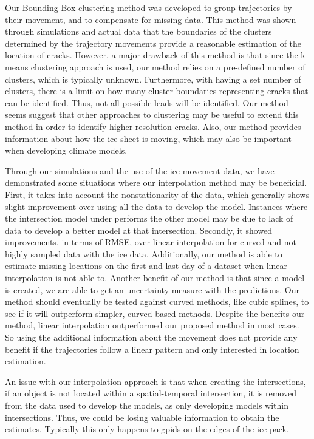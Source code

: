 \documentclass[12pt]{article}
\begin{document}
Our Bounding Box clustering method was developed to group trajectories
by their movement, and to compensate for missing data. This method was
shown through simulations and actual data that the boundaries of the
clusters determined by the trajectory movements provide a reasonable
estimation of the location of cracks. However, a major drawback of this
method is that since the k-means clustering approach is used, our method
relies on a pre-defined number of clusters, which is typically unknown.
Furthermore, with having a set number of clusters, there is a limit on
how many cluster boundaries representing cracks that can be identified.
Thus, not all possible leads will be identified. Our method seems
suggest that other approaches to clustering may be useful to extend this
method in order to identify higher resolution cracks. Also, our method
provides information about how the ice sheet is moving, which may also
be important when developing climate models.

Through our simulations and the use of the ice movement data, we have
demonstrated some situations where our interpolation method may be
beneficial. First, it takes into account the nonstationarity of the
data, which generally shows slight improvement over using all the data
to develop the model. Instances where the intersection model under
performs the other model may be due to lack of data to develop a better
model at that intersection. Secondly, it showed improvements, in terms
of RMSE, over linear interpolation for curved and not highly sampled
data with the ice data. Additionally, our method is able to estimate
missing locations on the first and last day of a dataset when linear
interpolation is not able to. Another benefit of our method is that
since a model is created, we are able to get an uncertainty measure with
the predictions. Our method should eventually be tested against curved
methods, like cubic splines, to see if it will outperform simpler,
curved-based methods. Despite the benefits our method, linear
interpolation outperformed our proposed method in most cases. So using
the additional information about the movement does not provide any
benefit if the trajectories follow a linear pattern and only interested
in location estimation.

An issue with our interpolation approach is that when creating the
intersections, if an object is not located within a spatial-temporal
intersection, it is removed from the data used to develop the models, as
only developing models within intersections. Thus, we could be losing
valuable information to obtain the estimates. Typically this only
happens to gpids on the edges of the ice pack.
\end{document}
